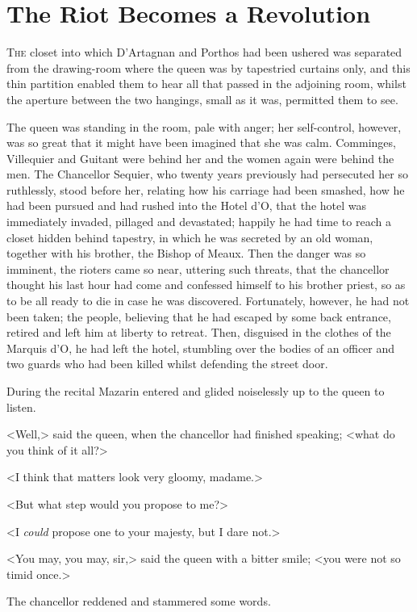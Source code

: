 \chapter{The Riot Becomes a Revolution}

 \lettrine{T}{he} closet into which D'Artagnan and Porthos had been ushered was separated from the drawing-room where the queen was by tapestried curtains only, and this thin partition enabled them to hear all that passed in the adjoining room, whilst the aperture between the two hangings, small as it was, permitted them to see.

The queen was standing in the room, pale with anger; her self-control, however, was so great that it might have been imagined that she was calm. Comminges, Villequier and Guitant were behind her and the women again were behind the men. The Chancellor Sequier, who twenty years previously had persecuted her so ruthlessly, stood before her, relating how his carriage had been smashed, how he had been pursued and had rushed into the Hotel d'O\doubleemdash, that the hotel was immediately invaded, pillaged and devastated; happily he had time to reach a closet hidden behind tapestry, in which he was secreted by an old woman, together with his brother, the Bishop of Meaux. Then the danger was so imminent, the rioters came so near, uttering such threats, that the chancellor thought his last hour had come and confessed himself to his brother priest, so as to be all ready to die in case he was discovered. Fortunately, however, he had not been taken; the people, believing that he had escaped by some back entrance, retired and left him at liberty to retreat. Then, disguised in the clothes of the Marquis d'O\doubleemdash, he had left the hotel, stumbling over the bodies of an officer and two guards who had been killed whilst defending the street door.

During the recital Mazarin entered and glided noiselessly up to the queen to listen.

<Well,> said the queen, when the chancellor had finished speaking; <what do you think of it all?>

<I think that matters look very gloomy, madame.>

<But what step would you propose to me?>

<I \textit{could} propose one to your majesty, but I dare not.>

<You may, you may, sir,> said the queen with a bitter smile; <you were not so timid once.>

The chancellor reddened and stammered some words.


